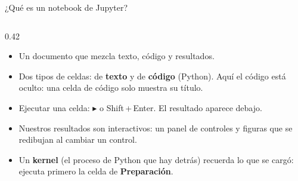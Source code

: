 \begin{frame}{¿Qué es un notebook de Jupyter?}
\begin{columns}[c]
    \begin{column}{0.42\linewidth}\footnotesize
      \begin{itemize}\setlength\itemsep{3pt}
        \item Un documento que mezcla \alert{texto, código y resultados}.
        \item Dos tipos de celdas: de \textbf{texto} y de \textbf{código} (Python). Aquí el código está \alert{oculto}: una celda de código solo muestra su título.
        \item Ejecutar una celda: \alert{$\blacktriangleright$} o \alert{Shift\,+\,Enter}. El resultado aparece debajo.
        \item Nuestros resultados son \alert{interactivos}: un panel de controles y figuras que se redibujan al cambiar un control.
        \item Un \textbf{kernel} (el proceso de Python que hay detrás) \alert{recuerda} lo que se cargó: ejecuta primero la celda de \textbf{Preparación}.
      \end{itemize}
    \end{column}
  \end{columns}
\end{frame}

